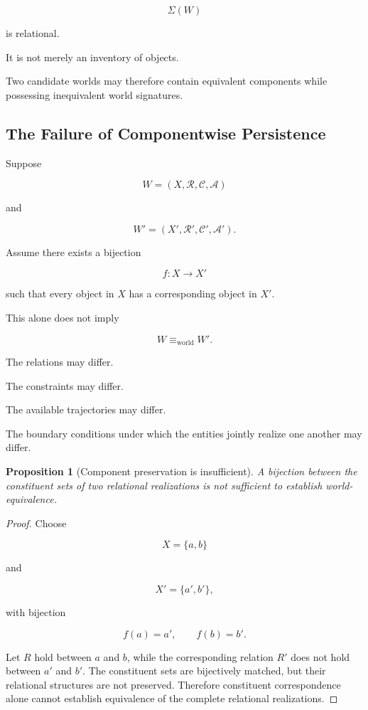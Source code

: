 \documentclass[
  11pt,
  a4paper,
  DIV=12,
  BCOR=0mm,
  parskip=half-
]{scrartcl}
\newcommand{\eqworld}{%
  \equiv_{\mathrm{world}}%
}
\theoremstyle{definition}
\theoremstyle{plain}
\newtheorem{proposition}[definition]{Proposition}
\theoremstyle{remark}
\begin{document}
\[
  \Sigma(W)
\]

is relational.

It is not merely an inventory of objects.

Two candidate worlds may therefore contain equivalent components while
possessing inequivalent world signatures.


\subsection{The Failure of Componentwise Persistence}
\label{app:componentwise-failure}

Suppose

\[
  W
  =
  (X,\mathcal R,\mathcal C,\mathcal A)
\]

and

\[
  W'
  =
  (X',\mathcal R',\mathcal C',\mathcal A').
\]

Assume there exists a bijection

\[
  f:X\to X'
\]

such that every object in \(X\) has a corresponding object in \(X'\).

This alone does not imply

\[
  W\eqworld W'.
\]

The relations may differ.

The constraints may differ.

The available trajectories may differ.

The boundary conditions under which the entities jointly realize one another
may differ.

\begin{proposition}[Component preservation is insufficient]
\label{prop:component-preservation-insufficient}
A bijection between the constituent sets of two relational realizations is not
sufficient to establish world-equivalence.
\end{proposition}

\begin{proof}
Choose

\[
  X=\{a,b\}
\]

and

\[
  X'=\{a',b'\},
\]

with bijection

\[
  f(a)=a',
  \qquad
  f(b)=b'.
\]

Let \(R\) hold between \(a\) and \(b\), while the corresponding relation
\(R'\) does not hold between \(a'\) and \(b'\). The constituent sets are
bijectively matched, but their relational structures are not preserved.
Therefore constituent correspondence alone cannot establish equivalence of
the complete relational realizations.
\end{proof}
\end{document}
